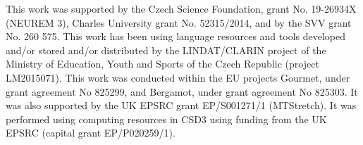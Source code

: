 \documentclass[12pt,notitlepage,a4paper,openright]{report}
\begin{document}
\vfill


{\noindent\footnotesize %
  This work was supported by the Czech Science Foundation, grant No. 19-26934X
  (NEUREM 3), Charles University grant No. 52315/2014, and by the SVV grant
  No. 260 575.  This work has been using language resources and tools developed
  and/or stored and/or distributed by the LINDAT/CLARIN project of the Ministry
  of Education, Youth and Sports of the Czech Republic (project LM2015071).
  This work was conducted within the EU projects Gourmet, under grant agreement
  No 825299, and Bergamot, under grant agreement No 825303. It was also
  supported by the UK EPSRC grant EP/S001271/1 (MTStretch). It was performed
  using computing resources in CSD3 using funding from the UK EPSRC (capital
  grant EP/P020259/1).%
}

\cleardoublepage{}
\tableofcontents %

\cleardoublepage{}
\renewcommand{\chapterheadstartvskip}{\vspace*{-10mm}} %

%
%
\renewcommand{\thepage}{\arabic{page}}
\setcounter{page}{1}

\sloppy







%
%

\renewcommand{\chapterheadstartvskip}{\vspace*{0mm}} %

\cleardoublepage{}

{\small }

\cleardoublepage{}
\renewcommand*{\acronymname}{List of Abbreviations}
\printglossary[type=\acronymtype,style=index]

{\small \listoftables\par}

{\small \listoffigures\par}

\cleardoublepage{}

\end{document}
